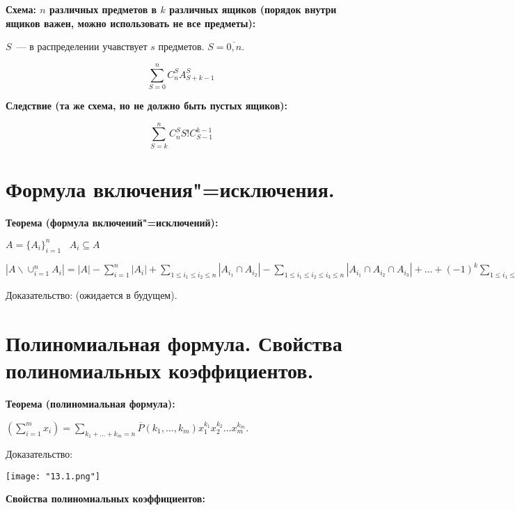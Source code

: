 \textbf{Схема: $n$ различных предметов в $k$ различных ящиков (порядок
внутри ящиков важен, можно использовать не все предметы):}
    \smallskip

    $S$~--- в распределении учавствует $s$ предметов. $S = \overline{0, n}$.
    \bigskip

    \[
        \sum\limits^n_{S=0} C^S_n A^S_{S + k - 1}  
    \]
    \bigskip

\textbf{Следствие (та же схема, но не должно быть пустых ящиков):}
    \smallskip
    
    \[
        \sum\limits^n_{S=k} C^S_n S! C^{k - 1}_{S-1}  
    \]

\section{Формула включения"=исключения.}    

\textbf{Теорема (формула включений"=исключений):}
    \smallskip

    $A = \{A_i\}^n_{i = 1} \;\;\; A_i \subseteq A$
    \bigskip

    $|A \backslash \cup^n_{i = 1} A_i| = |A| - \sum\limits^n_{i = 1} |A_i| +
    \sum\limits_{1 \leq i_1 \leq i_2 \leq n} |A_{i_1} \cap A_{i_2}| - 
    \sum\limits_{1 \leq i_1 \leq i_2 \leq i_3 \leq n} |A_{i_1} \cap A_{i_2} \cap A_{i_3}| +
    \dots + (-1)^k \sum\limits_{1 \leq i_1 \leq \dots \leq i_k \leq n} |A_{i_1} \cap \dots
    \cap A_{i_k}| + (-1)^n |A_1 \cap \dots \cap A_n|.$
    \bigskip

    Доказательство: (ожидается в будущем).

\section{Полиномиальная формула. Свойства полиномиальных коэффициентов.}

\textbf{Теорема (полиномиальная формула):}
    \smallskip

    $\left(\sum\limits^m_{i = 1} x_i\right) = \sum\limits_{k_1 + \dots + k_m = n}
    \overline{P}(k_1, \dots, k_m) x_1^{k_1} x_2^{k_2} \dots x_m^{k_m}$.
    \bigskip

    Доказательство:

    \begin{center}
        \texttt{[image: "13.1.png"]}
    \end{center}
    \bigskip

\textbf{Свойства полиномиальных коэффициентов:}
    \smallskip
    
